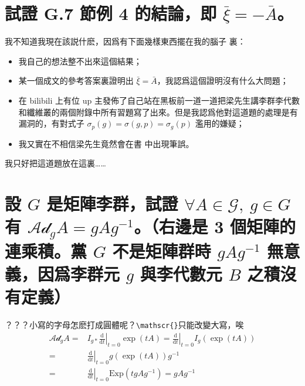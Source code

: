 \documentclass{article}
\begin{document}
\section{試證 G.7 節例 4 的結論，即 $\bar{\xi}=-\bar{A}$。}
\begin{framed}
  我不知道我現在該説什麽，因爲有下面幾樣東西擺在我的腦子  裏：
  \begin{itemize}
    \item 我自己的想法整不出來這個結果；
    \item 某一個成文的參考答案裏證明出 $\bar{\xi}=\bar{A}$，我認爲這個證明沒有什么大問題；
    \item 在 bilibili 上有位 up 主發佈了自己站在黑板前一道一道把梁先生講李群李代數和纖維叢的兩個附錄中所有習題寫了出來。但是我認爲他對這道題的處理是有漏洞的，有對式子 $\sigma_p(g)=\sigma(g,p)=\sigma_g(p)$ 濫用的嫌疑；
    \item 我又實在不相信梁先生竟然會在書  中出現筆誤。
  \end{itemize}
  我只好把這道題放在這裏……
\end{framed}

\section{設 $G$ 是矩陣李群，試證 $\forall A\in\mathscr{G},\ g\in G$ 有 $\mathscr{Ad}_{g}A=gAg^{-1}$。（右邊是 3 個矩陣的連乘積。黨 $G$ 不是矩陣群時 $gAg^{-1}$ 無意義，因爲李群元 $g$ 與李代數元 $B$ 之積沒有定義）}
\begin{framed}
  ？？？小寫的字母怎麽打成圓體呢？\texttt{\textbackslash mathscr\{\}}只能改變大寫，唉~
  $$\begin{aligned}
      \mathscr{Ad}_{g}A= & I_{g*}\left.\frac{\mathrm{d}}{\mathrm{d}t}\right|_{t=0}\exp(tA)=\left.\frac{\mathrm{d}}{\mathrm{d}t}\right|_{t=0}I_g\left(\exp(tA)\right) \\
      =                  & \left.\frac{\mathrm{d}}{\mathrm{d}t}\right|_{t=0}g\left(\exp(tA)\right)g^{-1}                                                             \\
      =                  & \left.\frac{\mathrm{d}}{\mathrm{d}t}\right|_{t=0}\mathrm{Exp}\left(tgAg^{-1}\right)=gAg^{-1}
    \end{aligned}
  $$
\end{framed}
\end{document}
